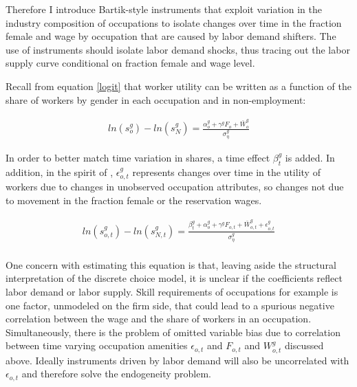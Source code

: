 \documentclass[12pt]{article}
\begin{document}
Therefore I introduce Bartik-style instruments that exploit variation in the industry composition of occupations to isolate changes over time in the fraction female and wage by occupation that are caused by labor demand shifters. The use of instruments should isolate labor demand shocks, thus tracing out the labor supply curve conditional on fraction female and wage level. 

 
%

Recall from equation \ref{logit} that worker utility can be written as a function of the share of workers by gender in each occupation and in non-employment:

\begin{align}
     ln(s^g_o) - ln(s^g_N) = \frac{\alpha^{g}_o + \gamma^g F_o + \bar{W}^g_o}{ \sigma^g_{\eta} }
\end{align}
 

In order to better match time variation in shares, a time effect $\beta^g_t$ is added. In addition, in the spirit of , $\epsilon^g_{o,t}$ represents changes over time in the utility of workers due to changes in unobserved occupation attributes, so changes not due to movement in the fraction female or the reservation wages.

\begin{align*}
ln(s^g_{o,t}) - ln(s^g_{N,t}) =   \frac{ \beta^g_t + \alpha^g_o +  \gamma^g F_{o,t} +  \bar{W}^g_{o,t} + \epsilon^g_{o,t}}{\sigma^g_{\eta}}  \\
\end{align*}

One concern with estimating this equation is that, leaving aside the structural interpretation of the discrete choice model, it is unclear if the coefficients reflect labor demand or labor supply. Skill requirements of occupations for example is one factor, unmodeled on the firm side, that could lead to a spurious negative correlation between the wage and the share of workers in an occupation. Simultaneously, there is the problem of omitted variable bias due to correlation between time varying occupation amenities $\epsilon_{o,t}$ and $F_{o,t}$ and $W^g_{o,t}$ discussed above. Ideally instruments driven by labor demand will also be uncorrelated with $\epsilon_{o,t}$ and therefore solve the endogeneity problem.
\end{document}
